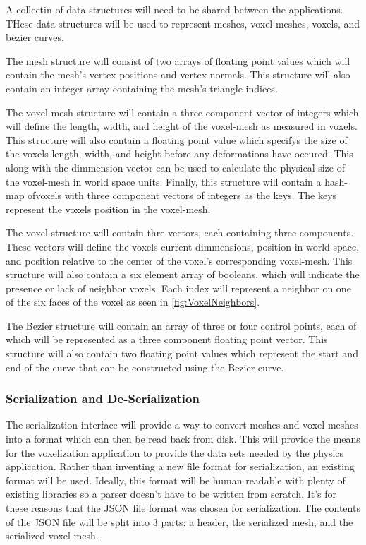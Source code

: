 A collectin of data structures will need to be shared between the applications. THese data 
structures will be used to represent meshes, voxel-meshes, voxels, and bezier curves.

The mesh structure will consist of two arrays of floating point values which will contain the mesh's
vertex positions and vertex normals. This structure will also contain an integer array containing 
the mesh's triangle indices.

The voxel-mesh structure will contain a three component vector of integers which will define the 
length, width, and height of the voxel-mesh as measured in voxels. This structure will also contain 
a floating point value which specifys the size of the voxels length, width, and height before any 
deformations have occured. This along with the dimmension vector can be used to calculate the 
physical size of the voxel-mesh in world space units. Finally, this structure will contain a
hash-map ofvoxels with three component vectors of integers as the keys. The keys represent the
voxels position in the voxel-mesh. %

The voxel structure will contain thre vectors, each containing three components. These vectors will 
define the voxels current dimmensions, position in world space, and position relative to the center
of the voxel's corresponding voxel-mesh. This structure will also contain a six element array of 
booleans, which will indicate the presence or lack of neighbor voxels. Each index will represent a 
neighbor on one of the six faces of the voxel as seen in \ref{fig:VoxelNeighbors}.

The Bezier structure will contain an array of three or four control points, each of which will be 
represented as a three component floating point vector. This structure will also contain two 
floating point values which represent the start and end of the curve that can be constructed using 
the Bezier curve.

\subsubsection{Serialization and De-Serialization}

The serialization interface will provide a way to convert meshes and voxel-meshes into a format 
which can then be read back from disk. This will provide the means for the voxelization application
to provide the data sets needed by the physics application. Rather than inventing a new file format 
for serialization, an existing format will be used. Ideally, this format will be human readable with 
plenty of existing libraries so a parser doesn't have to be written from scratch. It's for these
reasons that the JSON file format was chosen for serialization. The contents of the JSON file will 
be split into 3 parts: a header, the serialized mesh, and the serialized voxel-mesh.

